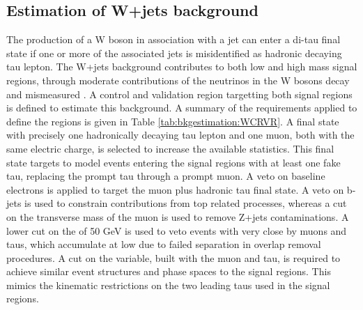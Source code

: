 \subsection{Estimation of W+jets background}
\label{sec:SS:Wjets}
\FloatBarrier
The production of a W boson in association with a jet can enter a di-tau final state if one or more of the associated jets is misidentified as hadronic decaying tau lepton.  The W+jets background contributes to both low and high mass signal regions,  through moderate \Met contributions of the neutrinos in the W bosons decay and mismeasured \Met. 
A control and validation region targetting both signal regions is defined to estimate this background.  A summary of the requirements applied to define the regions is given in Table \ref{tab:bkgestimation:WCRVR}.
A final state with precisely one hadronically decaying tau lepton and one muon,  both with the same electric charge,  is selected to increase the available statistics. 
This final state targets to model events entering the signal regions with at least one fake tau,  replacing the prompt tau through a prompt muon. 
A veto on baseline electrons is applied to target the muon plus hadronic tau final state.
A veto on b-jets is used to constrain contributions from top related processes,  whereas a cut on the transverse mass of the muon is used to remove Z+jets contaminations. 
A lower cut on the \Met of 50 GeV is used to veto events with very close by muons and taus,  which accumulate at low \Met due to failed separation in overlap removal procedures.  A cut on the \Mttwo variable,  built with the muon and tau,  is required to achieve similar event structures and phase spaces to the signal regions. 
This mimics the kinematic restrictions on the two leading taus used in the signal regions.

